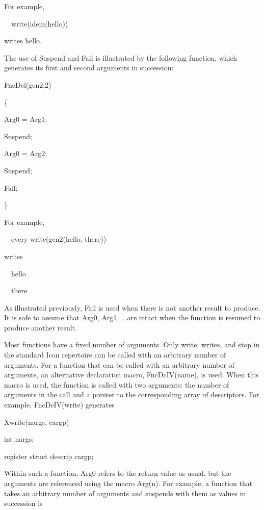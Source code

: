 For example,

{\ttfamily\mdseries
\ \ write(idem({\textquotedbl}hello{\textquotedbl}))}

\noindent writes hello.

The use of Suspend and Fail is illustrated by the following function,
which generates its first and second arguments in succession:

{\ttfamily\mdseries
FncDcl(gen2,2)}

{\ttfamily\mdseries
\{}

{\ttfamily\mdseries
Arg0 = Arg1;}

{\ttfamily\mdseries
Suspend;}

{\ttfamily\mdseries
Arg0 = Arg2;}

{\ttfamily\mdseries
Suspend;}

{\ttfamily\mdseries
Fail;}

{\ttfamily\mdseries
\}}


For example,


\ \ every write(gen2({\textquotedbl}hello{\textquotedbl}, {\textquotedbl}there{\textquotedbl}))


writes

{\ttfamily\mdseries
\ \ hello}

{\ttfamily\mdseries
\ \ there}


As illustrated previously, Fail is used when there is not another
result to produce. It is safe to assume that Arg0, Arg1, ...are intact
when the function is resumed to produce another result.

Most functions have a fixed number of arguments. Only write, writes,
and stop in the standard Icon repertoire can be called with an
arbitrary number of arguments. For a function that can be called with
an arbitrary number of arguments, an alternative declaration macro,
FncDcIV(name), is used. When this macro is used, the function is
called with two arguments: the number of arguments in the call and a
pointer to the corresponding array of descriptors. For example,
FncDcIV(write) generates

{\ttfamily\mdseries
Xwrite(nargs, cargp)}

{\ttfamily\mdseries
int nargs;}

{\ttfamily\mdseries
register struct descrip cargp;}


Within such a function, Arg0 refers to the return value as usual, but
the arguments are referenced using the macro Arg(n). For example, a
function that takes an arbitrary number of arguments and suspends with
them as values in succession is

